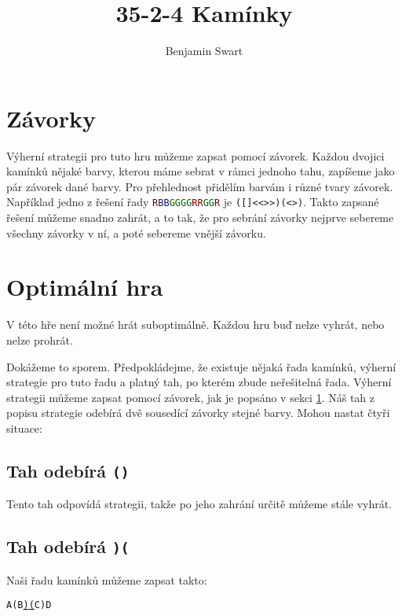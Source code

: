 \documentclass{article}
\title{35-2-4 Kamínky}
\author{Benjamin Swart}
\newcommand{\brackets}[4]{{\color{#1}#2}#4{\color{#1}#3}}
\newcommand{\bred}[1]{\brackets{Maroon}{(}{)}{#1}}
\newcommand{\bgreen}[1]{\brackets{DarkGreen}{<}{>}{#1}}
\newcommand{\bblue}[1]{\brackets{MidnightBlue}{[}{]}{#1}}
\newcommand{\bredl}{{\color{Maroon}(}}
\newcommand{\bredr}{{\color{Maroon})}}
\newcommand{\mred}{\textcolor{Maroon}{R}}
\newcommand{\mgreen}{\textcolor{DarkGreen}{G}}
\newcommand{\mblue}{\textcolor{MidnightBlue}{B}}
\begin{document}
\maketitle

\section{Závorky}
\label{section:parens}

Výherní strategii pro tuto hru můžeme zapsat pomocí závorek. Každou dvojici kamínků nějaké barvy, kterou máme sebrat v rámci jednoho tahu, zapíšeme jako pár závorek dané barvy. Pro přehlednost přidělím barvám i různé tvary závorek. Například jedno z řešení řady \texttt{\mred\mblue\mblue\mgreen\mgreen\mgreen\mgreen\mred\mred\mgreen\mgreen\mred} je \texttt{\bred{\bblue{}\bgreen{\bgreen{}}}\bred{\bgreen{}}}. Takto zapsané řešení můžeme snadno zahrát, a to tak, že pro sebrání závorky nejprve sebereme všechny závorky v ní, a poté sebereme vnější závorku.

\section{Optimální hra}

V této hře není možné hrát suboptimálně. Každou hru buď nelze vyhrát, nebo nelze prohrát.

Dokážeme to sporem. Předpokládejme, že existuje nějaká řada kamínků, výherní strategie pro tuto řadu a platný tah, po kterém zbude neřešitelná řada. Výherní strategii můžeme zapsat pomocí závorek, jak je popsáno v sekci \ref{section:parens}. Náš tah z popisu strategie odebírá dvě sousedící závorky stejné barvy. Mohou nastat čtyři situace:

\subsection[Tah odebírá ()]{Tah odebírá \texttt{\bred{}}}

Tento tah odpovídá strategii, takže po jeho zahrání určitě můžeme stále vyhrát.

\subsection[Tah odebírá )(]{Tah odebírá \texttt{\bredr\bredl}}

Naši řadu kamínků můžeme zapsat takto:

\begin{center}
    \texttt{{A}\bredl{B}\underline{\bredr\bredl}{C}\bredr{D}}
\end{center}
\end{document}
